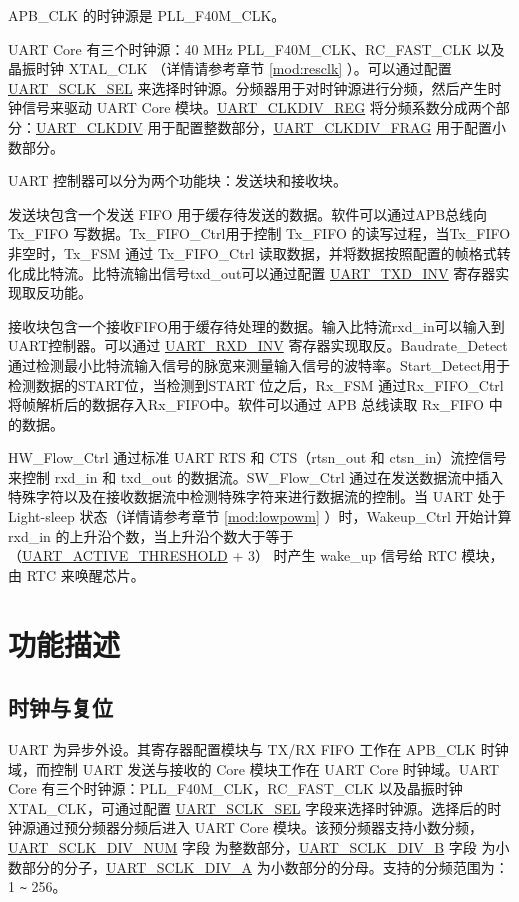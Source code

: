 \documentclass[main\_\_CN.tex]{subfiles}
\begin{document}
APB\_CLK 的时钟源是 PLL\_F40M\_CLK。

UART Core 有三个时钟源：40 MHz PLL\_F40M\_CLK、RC\_FAST\_CLK 以及晶振时钟 XTAL\_CLK （详情请参考章节 \ref{mod:resclk} \textit{}）。可以通过配置 \hyperref[fielddesc:UARTSCLKSEL]{UART\_SCLK\_SEL} 来选择时钟源。分频器用于对时钟源进行分频，然后产生时钟信号来驱动 UART Core 模块。\hyperref[regdesc:UARTCLKDIVREG]{UART\_CLKDIV\_REG} 将分频系数分成两个部分：\hyperref[fielddesc:UARTCLKDIV]{UART\_CLKDIV} 用于配置整数部分，\hyperref[fielddesc:UARTCLKDIVFRAG]{UART\_CLKDIV\_FRAG} 用于配置小数部分。

UART 控制器可以分为两个功能块：发送块和接收块。

发送块包含一个发送 FIFO 用于缓存待发送的数据。软件可以通过APB总线向 Tx\_FIFO 写数据。Tx\_FIFO\_Ctrl用于控制 Tx\_FIFO 的读写过程，当Tx\_FIFO 非空时，Tx\_FSM 通过 Tx\_FIFO\_Ctrl 读取数据，并将数据按照配置的帧格式转化成比特流。比特流输出信号txd\_out可以通过配置 \hyperref[fielddesc:UARTTXDINV]{UART\_TXD\_INV} 寄存器实现取反功能。

接收块包含一个接收FIFO用于缓存待处理的数据。输入比特流rxd\_in可以输入到UART控制器。可以通过
\hyperref[fielddesc:UARTRXDINV]{UART\_RXD\_INV} 寄存器实现取反。Baudrate\_Detect通过检测最小比特流输入信号的脉宽来测量输入信号的波特率。Start\_Detect用于检测数据的START位，当检测到START 位之后，Rx\_FSM 通过Rx\_FIFO\_Ctrl将帧解析后的数据存入Rx\_FIFO中。软件可以通过 APB 总线读取 Rx\_FIFO 中的数据。

HW\_Flow\_Ctrl 通过标准 UART RTS 和 CTS（rtsn\_out 和 ctsn\_in）流控信号来控制 rxd\_in 和 txd\_out 的数据流。SW\_Flow\_Ctrl 通过在发送数据流中插入特殊字符以及在接收数据流中检测特殊字符来进行数据流的控制。当 UART 处于 Light-sleep 状态（详情请参考章节 \ref{mod:lowpowm} \textit{}）时，Wakeup\_Ctrl 开始计算 rxd\_in 的上升沿个数，当上升沿个数大于等于 （\hyperref[fielddesc:UARTACTIVETHRESHOLD]{UART\_ACTIVE\_THRESHOLD} + 3） 时产生 wake\_up 信号给 RTC 模块，由 RTC 来唤醒芯片。

\section{功能描述}

\subsection{时钟与复位}
UART 为异步外设。其寄存器配置模块与 TX/RX FIFO 工作在 APB\_CLK 时钟域，而控制 UART 发送与接收的 Core 模块工作在 UART Core 时钟域。UART Core 有三个时钟源：PLL\_F40M\_CLK，RC\_FAST\_CLK 以及晶振时钟 XTAL\_CLK，可通过配置 \hyperref[fielddesc:UARTSCLKSEL]{UART\_SCLK\_SEL} 字段来选择时钟源。选择后的时钟源通过预分频器分频后进入 UART Core 模块。该预分频器支持小数分频，\hyperref[fielddesc:UARTSCLKDIVNUM]{UART\_SCLK\_DIV\_NUM} 字段 为整数部分，\hyperref[fielddesc:UARTSCLKDIVB]{UART\_SCLK\_DIV\_B} 字段 为小数部分的分子，\hyperref[fielddesc:UARTSCLKDIVA]{UART\_SCLK\_DIV\_A}  为小数部分的分母。支持的分频范围为：1 \verb+~+ 256。
\end{document}
